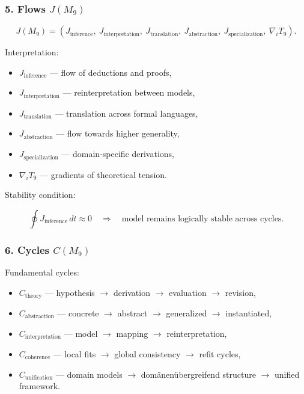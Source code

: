 \subsubsection*{5. Flows \texorpdfstring{$J(M_9)$}{J(M_9)}}

\[
J(M_9)=
(J_{\mathrm{inference}},\
J_{\mathrm{interpretation}},\
J_{\mathrm{translation}},\
J_{\mathrm{abstraction}},\
J_{\mathrm{specialization}},\
\nabla_i T_9).
\]

Interpretation:

\begin{itemize}
    \item $J_{\mathrm{inference}}$ — flow of deductions and proofs,
    \item $J_{\mathrm{interpretation}}$ — reinterpretation between models,
    \item $J_{\mathrm{translation}}$ — translation across formal languages,
    \item $J_{\mathrm{abstraction}}$ — flow towards higher generality,
    \item $J_{\mathrm{specialization}}$ — domain-specific derivations,
    \item $\nabla_i T_9$ — gradients of theoretical tension.
\end{itemize}

Stability condition:

\[
\oint J_{\mathrm{inference}}\,dt\approx 0
\quad\Rightarrow\quad
\text{model remains logically stable across cycles}.
\]

\subsubsection*{6. Cycles \texorpdfstring{$C(M_9)$}{C(M_9)}}

Fundamental cycles:

\begin{itemize}
    \item $C_{\mathrm{theory}}$ 
        — hypothesis $\to$ derivation $\to$ evaluation $\to$ revision,
    \item $C_{\mathrm{abstraction}}$ 
        — concrete $\to$ abstract $\to$ generalized $\to$ instantiated,
    \item $C_{\mathrm{interpretation}}$ 
        — model $\to$ mapping $\to$ reinterpretation,
    \item $C_{\mathrm{coherence}}$ 
        — local fits $\to$ global consistency $\to$ refit cycles,
    \item $C_{\mathrm{unification}}$ 
        — domain models $\to$ domänenübergreifend structure $\to$ unified framework.
\end{itemize}

